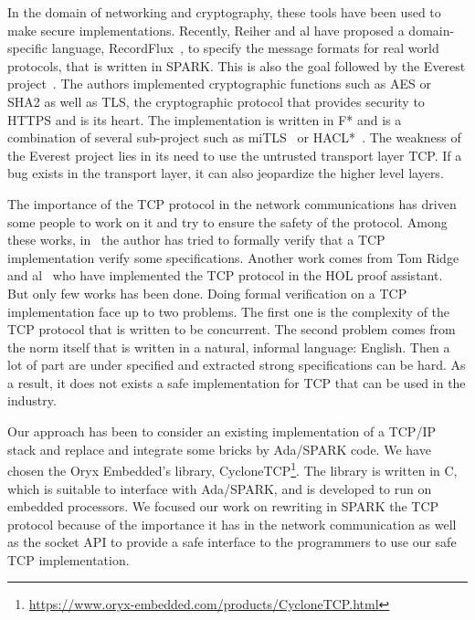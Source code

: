\documentclass[runningheads]{llncs}
\begin{document}
    In the domain of networking and cryptography, these tools have been used to make secure implementations. 
    Recently, Reiher and al have proposed a domain-specific language, RecordFlux~\cite{Reiher2019RecordFluxFM},
    to specify the message formats for real world protocols, that is written in SPARK.
    This is also the goal followed by the Everest project~\cite{bhargavan2017everest}.
    The authors implemented cryptographic functions such as AES or
    SHA2 as well as TLS, the cryptographic protocol that provides security
    to HTTPS and is its heart. The implementation is written
    in F* and is a combination of several sub-project such as miTLS~\cite{bhargavan2013implementing}
    or HACL*~\cite{zinzindohoue2017hacl}. The weakness of the Everest project lies in its need to use the untrusted
    transport layer TCP. If a bug exists in the transport layer, it can also jeopardize the higher level layers.

    The importance of the TCP protocol in the network communications has driven some people to work
    on it and try to ensure the safety of the protocol. Among these works, in~\cite{smith1996formal}
    the author has tried to formally verify that a TCP implementation verify some specifications.
    Another work comes from Tom Ridge and al~\cite{ridge2008rigorous} who have implemented the TCP
    protocol in the HOL proof assistant.
    But only few works has been done. Doing formal verification on a TCP implementation face up to two
    problems. The first one is the complexity of the TCP protocol that is written to be concurrent.
    The second problem comes from the norm itself that is written in a natural, informal language: English.
    Then a lot of part are under specified and extracted strong specifications can be hard.
    As a result, it does not exists a safe implementation for TCP that can be used in the industry.

    Our approach has been to consider an existing implementation of a TCP/IP stack and replace and integrate
    some bricks by Ada/SPARK code.
    We have chosen the Oryx Embedded's library, CycloneTCP\footnote{\url{https://www.oryx-embedded.com/products/CycloneTCP.html}}.
    The library is written in C, which is suitable to interface with Ada/SPARK, and is developed to run
    on embedded processors. We focused our work on rewriting in SPARK the TCP protocol because of the importance
    it has in the network communication as well as the socket API to provide a safe interface to the programmers
    to use our safe TCP implementation.
\end{document}
